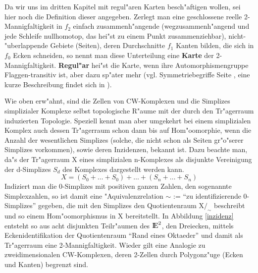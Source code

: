 Da wir uns im dritten Kapitel mit regul"aren Karten besch"aftigen wollen,
sei hier noch die Definition dieser angegeben. Zerlegt man eine geschlossene
reelle 2-Man\-nig\-fal\-tig\-keit in $f_2$ einfach zusammenh"angende
(wegzusammenh"angend und jede Schleife nullhomotop, das hei"st zu einem Punkt
zusammenziehbar), nicht-"uberlappende Gebiete (Seiten), deren Durchschnitte
$f_1$ Kanten bilden, die sich in $f_0$ Ecken schneiden, so nennt man diese
Unterteilung eine {\bf Karte} der 2-Mannigfaltigkeit. {\bf Regul"ar} hei"st die
Karte, wenn ihre Automorphismengruppe Flaggen-transitiv ist, aber dazu sp"ater
mehr (vgl. Symmetriebegriffe Seite \pageref{flag}, eine kurze Beschreibung
findet sich in \cite{BoWi:87}).

Wie oben erw"ahnt, sind die Zellen von CW-Komplexen und die Simplizes
simplizialer Komplexe selbst topologische R"aume mit der durch den Tr"agerraum
induzierten Topologie. Speziell kennt man aber umgekehrt bei einem
simplizialen Komplex auch dessen Tr"agerraum schon dann bis auf Hom"oomorphie,
wenn die Anzahl der wesentlichen Simplizes (solche, die nicht schon als
Seiten gr"o"serer Simplizes vorkommen), sowie deren Inzidenzen, bekannt ist.
Dazu beachte man, da"s der Tr"agerraum X eines simplizialen n-Komplexes als
disjunkte Vereinigung der d-Simplizes $S_d$ des Kom\-plex\-es dargestellt werden
kann.
$$X=(S_0+\ldots+S_0)+\ldots+(S_n+\ldots+S_n)$$
Indiziert man die 0-Simplizes mit positiven ganzen Zahlen, den sogenannte
Simplexzahlen, so ist damit eine "Aquivalenzrelation $\sim$ :=
"`zu identifizierende 0-Simplizes"' gegeben, die mit den Simplizes den
Quotientenraum X$/_\sim$ beschreibt und so einem Hom"oomorphismus in X
bereitstellt. In Abbildung \ref{inzidenz} entsteht so aus acht disjunkten
Teilr"aumen des $\mbox{$\rm I\!E$}^2$, den Dreiecken, mittels Eckenidentifikation der
Quotientenraum "`Rand eines Oktaeder"' und damit als Tr"agerraum eine
2-Mannigfaltigkeit. Wieder gilt eine Analogie zu zweidimensionalen CW-Komplexen,
deren 2-Zellen durch Polygonz"uge (Ecken und Kanten) begrenzt sind.

